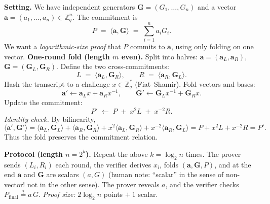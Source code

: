 \documentclass[11pt,a4paper]{article}
\begin{document}
\textbf{Setting.} We have independent generators $\mathbf{G}=(G_1,\dots,G_n)$ and a vector
$\mathbf{a}=(a_1,\dots,a_n)\in\mathbb{Z}_q^n$. The commitment is
\[
P \;=\; \langle \mathbf{a}, \mathbf{G} \rangle \;=\; \sum_{i=1}^n a_i G_i.
\]
We want a \emph{logarithmic-size proof} that $P$ commits to $\mathbf{a}$, using only folding on one vector.
\medskip
\textbf{One-round fold (length $m$ even).}
Split into halves:
$\mathbf{a}=(\mathbf{a}_L,\mathbf{a}_R)$, $\mathbf{G}=(\mathbf{G}_L,\mathbf{G}_R)$.
Define the two cross-commitments:
\[
L \;=\; \langle \mathbf{a}_L, \mathbf{G}_R \rangle,\qquad
R \;=\; \langle \mathbf{a}_R, \mathbf{G}_L \rangle.
\]
Hash the transcript to a challenge $x\in\mathbb{Z}_q^*$ (Fiat--Shamir).
Fold vectors and bases:
\[
\mathbf{a}' \leftarrow \mathbf{a}_L x + \mathbf{a}_R x^{-1},\qquad
\mathbf{G}' \leftarrow \mathbf{G}_L x^{-1} + \mathbf{G}_R x.
\]
Update the commitment:
\[
P' \;\leftarrow\; P \;+\; x^{2} L \;+\; x^{-2} R.
\]
\emph{Identity check.} By bilinearity,
\[
\langle \mathbf{a}', \mathbf{G}' \rangle
= \langle \mathbf{a}_L,\mathbf{G}_L\rangle + \langle \mathbf{a}_R,\mathbf{G}_R\rangle
+ x^2 \langle \mathbf{a}_L,\mathbf{G}_R\rangle + x^{-2} \langle \mathbf{a}_R,\mathbf{G}_L\rangle
= P + x^2 L + x^{-2} R = P'.
\]
Thus the fold preserves the commitment relation.

\medskip
\textbf{Protocol (length $n=2^k$).} Repeat the above $k=\log_2 n$ times. The prover sends $(L_i,R_i)$ each round, the verifier derives $x_i$, folds $(\mathbf{a},\mathbf{G},P)$, and at the end $\mathbf{a}$ and $\mathbf{G}$ are scalars $(a,G)$ (human note: ``scalar'' in the sense of non-vector! not in the other sense). The prover reveals $a$, and the verifier checks
$P_{\text{final}} \stackrel{?}{=} a\,G$.
\emph{Proof size:} $2\log_2 n$ points $+\ 1$ scalar.
\end{document}
